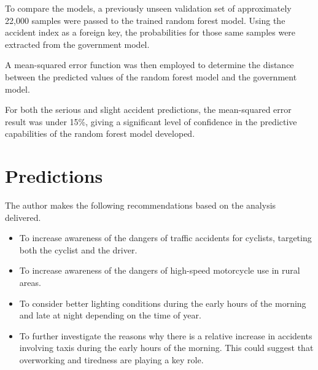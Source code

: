 \documentclass[12pt]{article}
\begin{document}
To compare the models, a previously unseen validation set of approximately 22,000 samples were passed to the trained random forest model. Using the accident index as a foreign key, the probabilities for those same samples were extracted from the government model.

A mean-squared error function was then employed to determine the distance between the predicted values of the random forest model and the government model.

For both the serious and slight accident predictions, the mean-squared error result was under 15\%, giving a significant level of confidence in the predictive capabilities of the random forest model developed.
\section{Predictions}

The author makes the following recommendations based on the analysis delivered.
\begin{itemize}
\item To increase awareness of the dangers of traffic accidents for cyclists, targeting both the cyclist and the driver.
\item To increase awareness of the dangers of high-speed motorcycle use in rural areas. 
\item To consider better lighting conditions during the early hours of the morning and late at night depending on the time of year.
\item To further investigate the reasons why there is a relative increase in accidents involving taxis during the early hours of the morning. This could suggest that overworking and tiredness are playing a key role.
\end{itemize}

\printbibliography
\end{document}

